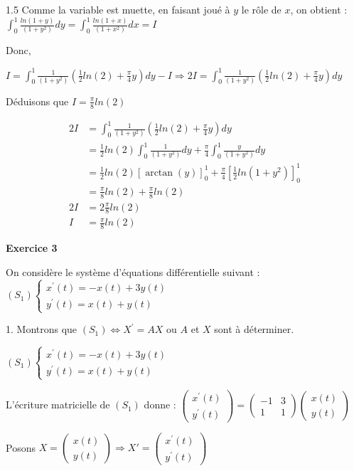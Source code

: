 \documentclass[12pt]{article}
\begin{document}
\begin{spacing}{1.5}
Comme la variable est muette, en faisant joué à $y$ le rôle de $x$, on obtient : $\int_{0}^{1}\frac{ln(1+y)}{(1+y^2)}dy=\int_{0}^{1}\frac{ln(1+x)}{(1+x^2)}dx=I$

Donc,

$I=\int_{0}^{1}\frac{1}{(1+y^2)}(\frac{1}{2}ln(2)+\frac{\pi}{4}y)dy-I\Rightarrow 2I=\int_{0}^{1}\frac{1}{(1+y^2)}(\frac{1}{2}ln(2)+\frac{\pi}{4}y)dy$

Déduisons que $I=\frac{\pi}{8}ln(2)$

\begin{align*}
2I &=\int_{0}^{1}\frac{1}{(1+y^2)}(\frac{1}{2}ln(2)+\frac{\pi}{4}y)dy\\
&=\frac{1}{2}ln(2)\int_{0}^{1}\frac{1}{(1+y^2)}dy+\frac{\pi}{4}\int_{0}^{1}\frac{y}{(1+y^2)}dy\\
&=\frac{1}{2}ln(2)[\arctan(y)]_0^1+\frac{\pi}{4}[\frac{1}{2}ln(1+y^2)]_0^1\\
&=\frac{\pi}{8}ln(2)+\frac{\pi}{8}ln(2)\\
2I &=2\frac{\pi}{8}ln(2)\\
I&=\frac{\pi}{8}ln(2)
\end{align*}


\medskip
\textbf{Exercice 3}


On considère le système d'équations différentielle suivant :  $(S_1)\begin{cases}
x^{\prime}(t)=-x(t) + 3 y(t)\\
y^{\prime}(t)=x(t) + y(t)
\end{cases}$

1. Montrons que $(S_1)\Longleftrightarrow X^{\prime} = AX$ ou $A$ et $X$ sont à déterminer.

$(S_1)\begin{cases}
x^{\prime}(t)=-x(t) + 3 y(t)\\
y^{\prime}(t)=x(t) + y(t)
\end{cases}$

L'écriture matricielle de $(S_1)$ donne : $\begin{pmatrix}
x^{\prime}(t)\\
y^{\prime}(t)
\end{pmatrix}=\begin{pmatrix}
-1 & 3 \\
1 & 1
\end{pmatrix}\begin{pmatrix}
x(t)\\
y(t)
\end{pmatrix}$

Posons $X=\begin{pmatrix}
x(t)\\
y(t)
\end{pmatrix}\Rightarrow X'=\begin{pmatrix}
x^{\prime}(t)\\
y^{\prime}(t)
\end{pmatrix}$


\end{spacing}
\end{document}
